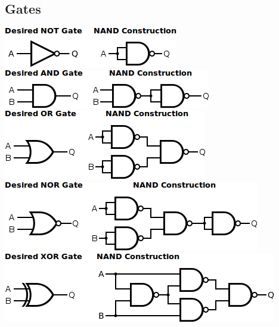 \documentclass[10pt]{article}
\begin{document}
\begin{multicols}{3}
    \subsection*{Gates}
    \includegraphics[width=\linewidth]{not.png}
    \includegraphics[width=\linewidth]{and.png}
    \includegraphics[width=\linewidth]{or.png}
    \includegraphics[width=\linewidth]{nor.png}
    \includegraphics[width=\linewidth]{xor.png}


\end{multicols}
\end{document}
